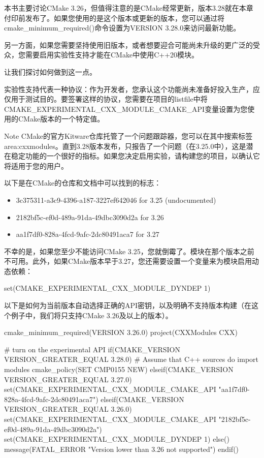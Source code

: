 
本书主要讨论CMake 3.26，但值得注意的是CMake经常更新，版本3.28就在本章付印前发布了。如果您使用的是这个版本或更新的版本，您可以通过将cmake\_minimum\_required()命令设置为VERSION 3.28.0来访问最新功能。

另一方面，如果您需要坚持使用旧版本，或者想要迎合可能尚未升级的更广泛的受众，您需要启用实验性支持才能在CMake中使用C++20模块。

让我们探讨如何做到这一点。


实验性支持代表一种协议：作为开发者，您承认这个功能尚未准备好投入生产，应仅用于测试目的。要签署这样的协议，您需要在项目的listfile中将CMAKE\_EXPERIMENTAL\_CXX\_MODULE\_CMAKE\_API变量设置为您使用的CMake版本的一个特定值。

\begin{myNotic}{Note}
CMake的官方Kitware仓库托管了一个问题跟踪器，您可以在其中搜索标签area:cxxmodules。直到3.28版本发布，只报告了一个问题（在3.25.0中），这是潜在稳定功能的一个很好的指标。如果您决定启用实验，请构建您的项目，以确认它将适用于您的用户。
\end{myNotic}

以下是在CMake的仓库和文档中可以找到的标志：

\begin{itemize}
\item
3c375311-a3c9-4396-a187-3227ef642046 for 3.25 (undocumented)

\item
2182bf5c-ef0d-489a-91da-49dbc3090d2a for 3.26

\item
aa1f7df0-828a-4fcd-9afc-2dc80491aca7 for 3.27
\end{itemize}

不幸的是，如果您至少不能访问CMake 3.25，您就倒霉了。模块在那个版本之前不可用。此外，如果CMake版本早于3.27，您还需要设置一个变量来为模块启用动态依赖：

\begin{cmake}
set(CMAKE_EXPERIMENTAL_CXX_MODULE_DYNDEP 1)
\end{cmake}

以下是如何为当前版本自动选择正确的API密钥，以及明确不支持版本构建（在这个例子中，我们将只支持CMake 3.26及以上的版本）。


\begin{cmake}
cmake_minimum_required(VERSION 3.26.0)
project(CXXModules CXX)

# turn on the experimental API
if(CMAKE_VERSION VERSION_GREATER_EQUAL 3.28.0)
    # Assume that C++ sources do import modules
    cmake_policy(SET CMP0155 NEW)
elseif(CMAKE_VERSION VERSION_GREATER_EQUAL 3.27.0)
    set(CMAKE_EXPERIMENTAL_CXX_MODULE_CMAKE_API
        "aa1f7df0-828a-4fcd-9afc-2dc80491aca7")
elseif(CMAKE_VERSION VERSION_GREATER_EQUAL 3.26.0)
    set(CMAKE_EXPERIMENTAL_CXX_MODULE_CMAKE_API
        "2182bf5c-ef0d-489a-91da-49dbc3090d2a")
    set(CMAKE_EXPERIMENTAL_CXX_MODULE_DYNDEP 1)
else()
    message(FATAL_ERROR "Version lower than 3.26 not supported")
endif()
\end{cmake}

